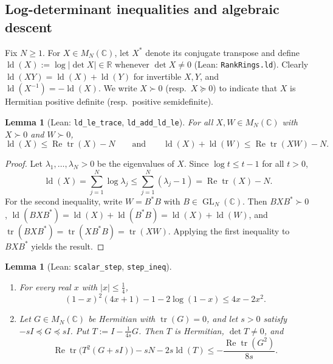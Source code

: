 \documentclass[11pt]{article}
\newtheorem{lemma}[theorem]{Lemma}
\theoremstyle{definition}
\theoremstyle{remark}
\numberwithin{equation}{section}
\DeclareMathOperator{\tr}{tr}
\DeclareMathOperator{\ld}{ld}
\DeclareMathOperator{\GL}{GL}
\DeclareMathOperator{\RePart}{Re}
\newcommand{\R}{\mathbb{R}}
\newcommand{\C}{\mathbb{C}}
\newcommand{\1}{\mathbf{1}}
\newcommand{\code}[1]{{\normalfont\small\texttt{#1}}}
\begin{document}
\subsection{Log-determinant inequalities and algebraic descent}

Fix $N \ge 1$. For $X \in M_N(\C)$, let $X^*$ denote its conjugate transpose and define $\ld(X) := \log |\det X| \in \R$ whenever $\det X \neq 0$ (Lean: \code{RankRings.ld}). Clearly $\ld(XY) = \ld(X) + \ld(Y)$ for invertible $X, Y$, and $\ld(X^{-1}) = -\ld(X)$. We write $X \succ 0$ (resp.\ $X \succeq 0$) to indicate that $X$ is Hermitian positive definite (resp.\ positive semidefinite).

\begin{lemma}[Lean: \code{ld\_le\_trace}, \code{ld\_add\_ld\_le}]
\label{lem:ld-trace}
For all $X, W \in M_N(\C)$ with $X \succ 0$ and $W \succ 0$,
\[
\ld(X) \le \RePart\tr(X) - N
\qquad\text{and}\qquad
\ld(X) + \ld(W) \le \RePart\tr(XW) - N.
\]
\end{lemma}

\begin{proof}
Let $\lambda_1, \dots, \lambda_N > 0$ be the eigenvalues of $X$. Since $\log t \le t - 1$ for all $t > 0$,
\[
\ld(X) = \sum_{j=1}^N \log \lambda_j \le \sum_{j=1}^N (\lambda_j - 1) = \RePart\tr(X) - N.
\]
For the second inequality, write $W = B^* B$ with $B \in \GL_N(\C)$. Then $B X B^* \succ 0$, $\ld(B X B^*) = \ld(X) + \ld(B^* B) = \ld(X) + \ld(W)$, and $\tr(B X B^*) = \tr(X B^* B) = \tr(XW)$. Applying the first inequality to $B X B^*$ yields the result.
\end{proof}

\begin{lemma}[Lean: \code{scalar\_step}, \code{step\_ineq}]
\label{lem:step-ineq}
\leavevmode
\begin{enumerate}[label=\textup{(\alph*)},leftmargin=2.2em]
\item For every real $x$ with $|x| \le \frac{1}{4}$,
\[
(1 - x)^2 (4x + 1) - 1 - 2\log(1 - x) \le 4x - 2x^2.
\]
\item Let $G \in M_N(\C)$ be Hermitian with $\tr(G) = 0$, and let $s > 0$ satisfy $-sI \preceq G \preceq sI$. Put $T := I - \frac{1}{4s} G$. Then $T$ is Hermitian, $\det T \neq 0$, and
\[
\RePart\tr\bigl(T^2 (G + sI)\bigr) - sN - 2s\ld(T) \le -\frac{\RePart\tr(G^2)}{8s}.
\]
\end{enumerate}
\end{lemma}
\end{document}
